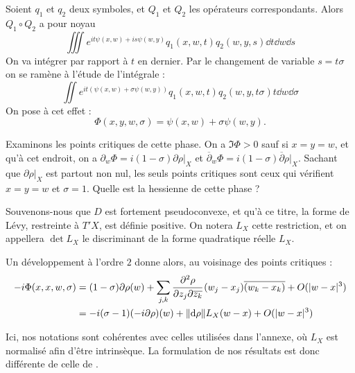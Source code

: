 Soient $q_1$ et $q_2$ deux symboles, et $Q_1$ et $Q_2$ les opérateurs correspondants. Alors $Q_1\circ Q_2$ a pour noyau
\begin{equation*}
  \iiint e^{it\psi(x,w)+is\psi(w,y)}q_1(x,w,t)q_2(w,y,s)\dd t\dd w\dd s
\end{equation*}
On va intégrer par rapport à $t$ en dernier. Par le changement de variable $s=t\sigma$ on se ramène à l'étude de l'intégrale :
\begin{equation*}
  \iint e^{it(\psi(x,w)+\sigma
    \psi(w,y))}q_1(x,w,t)q_2(w,y,t\sigma)t\dd w\dd\sigma
\end{equation*}
On pose à cet effet :
\begin{equation*}
  \Phi(x,y,w,\sigma)=\psi(x,w)+\sigma \psi(w,y).
\end{equation*}

Examinons les points critiques de cette phase. On a $\Im \Phi >0$ sauf si $x=y=w$, et qu'à cet endroit, on a $\partial_w\Phi = i(1-\sigma)\partial \rho|_X$ et $\overline{\partial}_w\Phi=i(1-\sigma)\overline{\partial}\rho|_X$. Sachant que $\partial \rho|_X$ est partout non nul, les seuls points critiques sont ceux qui vérifient $x=y=w$ et $\sigma =1$.
Quelle est la hessienne de cette phase ? 

Souvenons-nous que $D$ est fortement pseudoconvexe, et qu'à ce titre, la forme de Lévy, restreinte à $T'X$, est définie positive. On notera $L_X$ cette restriction, et on appellera $\det L_X$ le discriminant de la forme quadratique réelle $L_X$. 

Un développement à l'ordre $2$ donne alors, au voisinage des points critiques :
\begin{align*}
  -i\Phi(x,x,w,\sigma)&=(1-\sigma) \partial\rho(w) + \sum_{j,k}\cfrac{\partial^2\rho}{\partial z_j\partial \overline{z_k}}\,(w_j-x_j)\overline{(w_k-x_k)} + O(|w-x|^3)\\
  &= -i(\sigma-1) (-i\partial\rho)(w) + \|\mathrm{d}\rho\|L_{X}(w-x) + O(|w-x|^3)
\end{align*}

\begin{rem}
Ici, nos notations sont cohérentes avec celles utilisées dans l'annexe, où $L_X$ est normalisé afin d'être intrinsèque. La formulation de nos résultats est donc différente de celle de \cite{BoutetdeMonvel1975}.
\end{rem}

